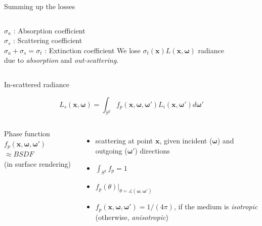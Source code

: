 \documentclass[
  english,            %
  aspectratio=169,    %
]{tumbeamer}
\newcommand\bx[0]{\textbf{x}}
\newcommand\bomega[0]{\boldsymbol{\omega}}
\begin{document}
\begin{frame}{Summing up the losses}
\begin{figure}[ht]
    \centering
    
    \label{fig:interactions}
\end{figure}

\begin{columns}[t, onlytextwidth]
    $\sigma_a$ : Absorption coefficient  \\
    $\sigma_s$ : Scattering coefficient \\
    $\sigma_a + \sigma_s = \sigma_t $ : Extinction coefficient
    We lose 
    $\sigma_t(\bx)L(\bx, \bomega)$
    radiance \\ due to \textit{absorption} and \textit{out-scattering}.
    
\end{columns}
\vspace{3mm}


\end{frame}

\begin{frame}{In-scattered radiance}
\begin{figure}[ht]
    \centering
    \scalebox{.6}{
        
    }
\end{figure}
$$ L_s(\bx, \bomega) = \int_{S^2} f_p(\bx, \bomega, \bomega') L_i(\bx, \bomega')
    d\bomega' $$

\begin{columns}[t, onlytextwidth]
    Phase function $f_p(\bx, \bomega, \bomega')$ \\
    \vspace{.3em}
    \scriptsize{$\approx BSDF$ \\(in surface rendering)}
    \begin{itemize}
        \item scattering at point $\bx$, given incident ($\bomega$) and outgoing
            ($\bomega'$) directions
        \item $\int_{S^2} f_p = 1$
        \item $f_p(\theta)\big|_{\theta = \measuredangle(\bomega, \bomega')}$
        \item $f_p(\bx, \bomega, \bomega') = 1/(4\pi)$, if the medium is
            \textit{isotropic}\\\hfill(otherwise, \textit{anisotropic})
    \end{itemize}
\end{columns}

\end{frame}
\end{document}
